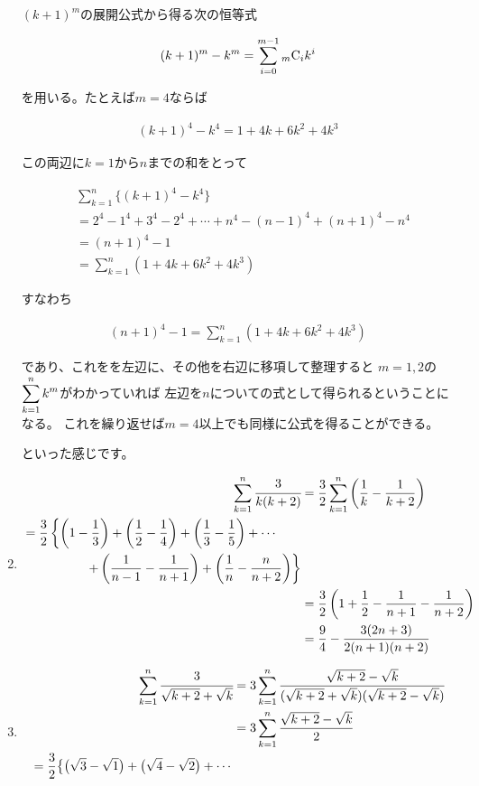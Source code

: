 \documentclass[a4paper]{ltjsarticle}
\newcommand{\flan}[1]{\begin{fleqn}[20pt]\begin{align*} #1 \end{align*}\end{fleqn}}
\begin{document}
\begin{question*}
\begin{ans*}
\begin{enumerate}[label=\arabic*.]
\begin{supple*}
  $(k+1)^m$の展開公式から得る次の恒等式
  \flan{
      (k+1)^m - k^m = \sum_{i=0}^{m-1}{}_{m}\rm{C}_{i}k^i
  }
  を用いる。たとえば$m=4$ならば
  \flan{
      (k+1)^4 - k^4 = 1 + 4k + 6k^2 + 4k^3
  }
  この両辺に$k=1$から$n$までの和をとって
  \flan{
      &\sum_{k=1}^{n} \{(k+1)^4 - k^4 \} \\
      &= 2^4 - 1^4 + 3^4 - 2^4 + \cdots + n^4 - (n-1)^4 + (n+1)^4 - n^4 \\
      &= (n+1)^4 - 1 \\
      &=\sum_{k=1}^{n}(1 + 4k + 6k^2 + 4k^3)
  }
  すなわち
  \flan{
      (n+1)^4 - 1 = \sum_{k=1}^{n}(1 + 4k + 6k^2 + 4k^3)
  }
  であり、これをを左辺に、その他を右辺に移項して整理すると
  $m=1,2$の$\displaystyle \sum_{k=1}^{n}k^m$がわかっていれば
  左辺を$n$についての式として得られるということになる。
  これを繰り返せば$m=4$以上でも同様に公式を得ることができる。
\end{supple*}
といった感じです。
  \item
    \flan{
        \sum_{k=1}^{n}\cfrac{3}{k(k+2)}
        &= \frac{3}{2}\sum_{k=1}^{n}\left( \frac{1}{k} - \frac{1}{k+2} \right) \\
        \begin{split}
          &= \frac{3}{2} \left\{
            \left(1-\frac{1}{3}\right) + \left(\frac{1}{2}-\frac{1}{4}\right)
            + \left(\frac{1}{3}-\frac{1}{5}\right)
            + \cdots \right. \\
          & \left.\hspace*{50pt}
            + \left(\frac{1}{n-1}-\frac{1}{n+1}\right)
            + \left(\frac{1}{n}-\frac{n}{n+2}\right)
            \right\}
        \end{split} \\
        &= \frac{3}{2}\left(1+\frac{1}{2}-\frac{1}{n+1}-\frac{1}{n+2}\right) \\
        &= \frac{9}{4} - \frac{3(2n+3)}{2(n+1)(n+2)}
      }
  \item
    \flan{
        \sum_{k=1}^{n}\cfrac{3}{\sqrt{k+2} + \sqrt{k}}
        &= 3 \sum_{k=1}^{n}\frac{\sqrt{k+2}-\sqrt{k}}{(\sqrt{k+2}+\sqrt{k})(\sqrt{k+2}-\sqrt{k})} \\
        &= 3 \sum_{k=1}^{n}\frac{\sqrt{k+2}-\sqrt{k}}{2} \\
        \begin{split}
          &= \frac{3}{2}\bigl\{
            \bigl(\sqrt{3}-\sqrt{1}\bigr)
            + \bigl(\sqrt{4}-\sqrt{2}\bigr)
            + \cdots \bigr. \\
          &\bigl.\hspace*{50pt}

\end{split}}
\end{enumerate}
\end{ans*}
\end{question*}
\end{document}

